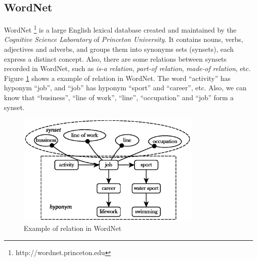 \subsection{WordNet}
WordNet \cite{miller1995wordNet}\footnote{http://wordnet.princeton.edu} is a large English lexical database created and maintained by the {\em Cognitive Science Laboratory} of {\em Princeton University}. It contains nouns, verbs, adjectives and adverbs, and groups them into synonyms sets (synsets), each express a distinct concept. Also, there are some relations between synsets recorded in WordNet, such as {\em is-a relation}, {\em part-of relation}, {\em made-of relation}, etc. Figure \ref{fig:wn} shows a example of relation in WordNet. The word ``activity'' has hyponym ``job'', and ``job'' has hyponym ``sport'' and ``career'', etc. Also, we can know that ``business'', ``line of work'', ``line'', ``occupation'' and ``job'' form a synset.

\begin{figure}[!hb]
\centering
\includegraphics[width=0.8\textwidth]{figures/wordnet.eps}
\caption{Example of relation in WordNet}
\label{fig:wn}
\end{figure}


